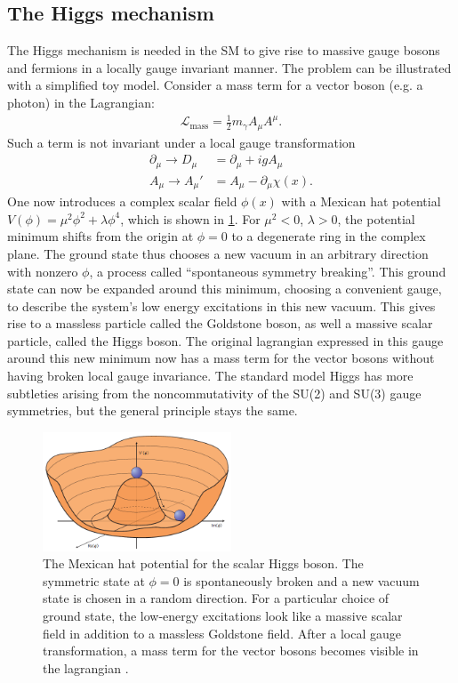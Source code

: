 \documentclass[twoside,        %
               BCOR12mm,       %
               ngerman,english, %
               fleqn,headsepline=false,footsepline=false
              ]{Vorlage/MFPREPORT}
\begin{document}
\subsection{The Higgs mechanism}
\cite[Ch. 17]{thomson}
The Higgs mechanism is needed in the SM to give rise to massive gauge bosons
and fermions in a locally gauge invariant manner.
The problem can be illustrated with a simplified toy model. Consider a mass
term for a vector boson (e.g. a photon) in the Lagrangian:
\begin{align}
    \mathcal{L}_\text{mass}=\frac{1}{2}m_\gamma A_\mu A^\mu.
    \label{eq:massterm}
\end{align}
Such a term is not invariant under a local gauge transformation
\begin{align}
    \partial_\mu\rightarrow D_\mu&=\partial_\mu+i g A_\mu\\
    A_\mu\rightarrow A_\mu'&=A_\mu-\partial_\mu \chi(x).
    \label{eq:gauge}
\end{align}
One now introduces a complex scalar field $\phi(x)$ with a Mexican hat
potential $V(\phi)=\mu^2\phi^2+\lambda\phi^4$, which is shown in
\cref{fig:mexhat}. For $\mu^2<0$, $\lambda>0$, the potential minimum shifts
from the origin at $\phi=0$ to a degenerate ring in the complex plane. The
ground state thus chooses a new vacuum in an arbitrary direction with nonzero
$\phi$, a process called ``spontaneous symmetry breaking''. This ground state
can now be expanded around this minimum, choosing a convenient gauge, to
describe the system's low energy excitations in this new vacuum. This gives
rise to a massless particle called the Goldstone boson, as well a massive scalar
particle, called the Higgs boson. The original lagrangian expressed in this
gauge around this new minimum now has a mass term for the vector bosons without
having broken local gauge invariance.
The standard model Higgs has more subtleties arising from the noncommutativity
of the SU(2) and SU(3) gauge symmetries, but the general principle stays the
same.


\begin{figure}[]
    \centering
    \includegraphics[width=0.5\textwidth]{fig/higgspotential}
    \caption{The Mexican hat potential for the scalar Higgs boson. The
    symmetric state at $\phi=0$ is spontaneously broken and a new vacuum state
is chosen in a random direction. For a particular choice of ground state, the
low-energy excitations look like a massive scalar field in addition to a
massless Goldstone field. After a local gauge transformation, a mass term
for the vector bosons becomes visible in the lagrangian \cite{mexhat}.}
    \label{fig:mexhat}
\end{figure}
\end{document}
